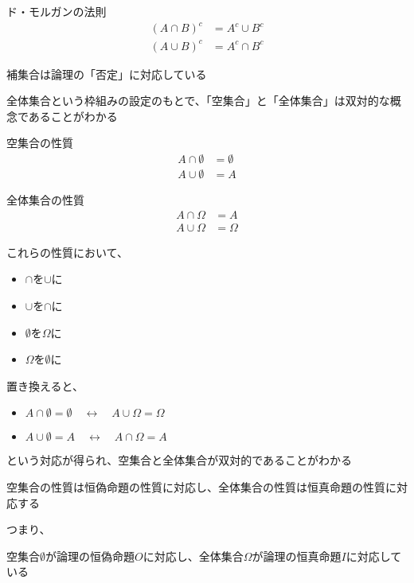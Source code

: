\documentclass[b5paper,12pt]{jsarticle}
\begin{document}
\begin{theorem}{ド・モルガンの法則}
  \begin{align*}
    (A \cap B)^c & = A^c \cup B^c \\
    (A \cup B)^c & = A^c \cap B^c
  \end{align*}
\end{theorem}

補集合は論理の「否定」に対応している

\sectionline

全体集合という枠組みの設定のもとで、「空集合」と「全体集合」は双対的な概念であることがわかる

\begin{theorem}{空集合の性質}
  \begin{align*}
    A \cap \emptyset & = \emptyset \\
    A \cup \emptyset & = A
  \end{align*}
\end{theorem}

\begin{theorem}{全体集合の性質}
  \begin{align*}
    A \cap \Omega & = A      \\
    A \cup \Omega & = \Omega
  \end{align*}
\end{theorem}

これらの性質において、
\begin{itemize}
  \item $\cap$を$\cup$に
  \item $\cup$を$\cap$に
  \item $\emptyset$を$\Omega$に
  \item $\Omega$を$\emptyset$に
\end{itemize}
置き換えると、
\begin{itemize}
  \item $A \cap \emptyset = \emptyset \quad \leftrightarrow \quad A \cup \Omega = \Omega$
  \item $A \cup \emptyset = A \quad \leftrightarrow \quad A \cap \Omega = A$
\end{itemize}
という対応が得られ、空集合と全体集合が双対的であることがわかる

\sectionline

空集合の性質は恒偽命題の性質に対応し、全体集合の性質は恒真命題の性質に対応する

\br

つまり、
\begin{shaded}
  空集合$\emptyset$が論理の恒偽命題$O$に対応し、全体集合$\Omega$が論理の恒真命題$I$に対応している
\end{shaded}
\end{document}
